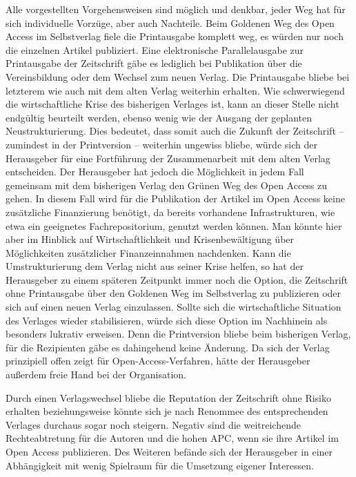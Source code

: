 \documentclass[a4paper,
fontsize=11pt,
oneside,
numbers=noperiodatend,
parskip=half-,
bibliography=totoc,
final
]{scrartcl}
\begin{document}
Alle vorgestellten Vorgehensweisen sind möglich und denkbar, jeder Weg
hat für sich individuelle Vorzüge, aber auch Nachteile. Beim Goldenen
Weg des Open Access im Selbstverlag fiele die Printausgabe komplett weg,
es würden nur noch die einzelnen Artikel publiziert. Eine elektronische
Parallelausgabe zur Printausgabe der Zeitschrift gäbe es lediglich bei
Publikation über die Vereinsbildung oder dem Wechsel zum neuen Verlag.
Die Printausgabe bliebe bei letzterem wie auch mit dem alten Verlag
weiterhin erhalten. Wie schwerwiegend die wirtschaftliche Krise des
bisherigen Verlages ist, kann an dieser Stelle nicht endgültig beurteilt
werden, ebenso wenig wie der Ausgang der geplanten Neustrukturierung.
Dies bedeutet, dass somit auch die Zukunft der Zeitschrift -- zumindest
in der Printversion -- weiterhin ungewiss bliebe, würde sich der
Herausgeber für eine Fortführung der Zusammenarbeit mit dem alten Verlag
entscheiden. Der Herausgeber hat jedoch die Möglichkeit in jedem Fall
gemeinsam mit dem bisherigen Verlag den Grünen Weg des Open Access zu
gehen. In diesem Fall wird für die Publikation der Artikel im Open
Access keine zusätzliche Finanzierung benötigt, da bereits vorhandene
Infrastrukturen, wie etwa ein geeignetes Fachrepositorium, genutzt
werden können. Man könnte hier aber im Hinblick auf Wirtschaftlichkeit
und Krisenbewältigung über Möglichkeiten zusätzlicher Finanzeinnahmen
nachdenken. Kann die Umstrukturierung dem Verlag nicht aus seiner Krise
helfen, so hat der Herausgeber zu einem späteren Zeitpunkt immer noch
die Option, die Zeitschrift ohne Printausgabe über den Goldenen Weg im
Selbstverlag zu publizieren oder sich auf einen neuen Verlag
einzulassen. Sollte sich die wirtschaftliche Situation des Verlages
wieder stabilisieren, würde sich diese Option im Nachhinein als
besonders lukrativ erweisen. Denn die Printversion bliebe beim
bisherigen Verlag, für die Rezipienten gäbe es dahingehend keine
Änderung. Da sich der Verlag prinzipiell offen zeigt für
Open-Access-Verfahren, hätte der Herausgeber außerdem freie Hand bei der
Organisation.

Durch einen Verlagswechsel bliebe die Reputation der Zeitschrift ohne
Risiko erhalten beziehungsweise könnte sich je nach Renommee des
entsprechenden Verlages durchaus sogar noch steigern. Negativ sind die
weitreichende Rechteabtretung für die Autoren und die hohen APC, wenn
sie ihre Artikel im Open Access publizieren. Des Weiteren befände sich
der Herausgeber in einer Abhängigkeit mit wenig Spielraum für die
Umsetzung eigener Interessen.
\end{document}

